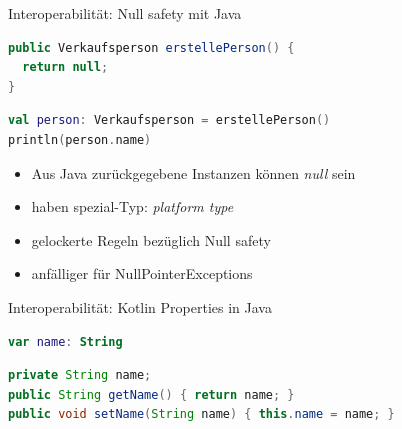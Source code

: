 \documentclass{beamer}
\begin{document}
\begin{frame}[fragile]{Interoperabilität: Null safety mit Java}
  \begin{lstlisting}[language=Java]
public Verkaufsperson erstellePerson() {
  return null;
}
  \end{lstlisting}
  \pause
  \begin{lstlisting}[language=Kotlin]
val person: Verkaufsperson = erstellePerson()
println(person.name)
  \end{lstlisting}
  \pause
  \begin{itemize}[<+->]
    \item Aus Java zurückgegebene Instanzen können \textit{null} sein
    \item haben spezial-Typ: \textit{platform type}
    \item gelockerte Regeln bezüglich Null safety
    \item anfälliger für NullPointerExceptions
  \end{itemize}
\end{frame}

\begin{frame}[fragile]{Interoperabilität: Kotlin Properties in Java}
  \begin{lstlisting}[language=Kotlin]
var name: String
    \end{lstlisting}
    \pause
    \begin{lstlisting}[language=Java]
private String name;
public String getName() { return name; }
public void setName(String name) { this.name = name; }
      \end{lstlisting}
\end{frame}
\end{document}
